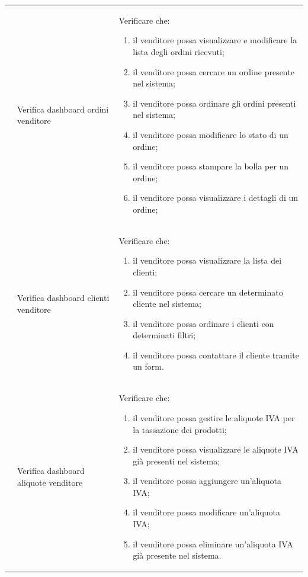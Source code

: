\begin{center}
\begin{longtable}{|p{1cm}|p{4.85cm}|p{9cm}|}
		 & Verifica dashboard ordini venditore & Verificare che:
		\begin{enumerate}
			\item il venditore possa visualizzare e modificare la lista degli ordini ricevuti;
			\item il venditore possa cercare un ordine presente nel sistema;
			\item il venditore possa ordinare gli ordini presenti nel sistema;
			\item il venditore possa modificare lo stato di un ordine;
			\item il venditore possa stampare la bolla per un ordine;
			\item il venditore possa visualizzare i dettagli di un ordine;
		\end{enumerate} \\

		 & Verifica dashboard clienti venditore & Verificare che:
		\begin{enumerate}
			\item il venditore possa visualizzare la lista dei clienti;
			\item il venditore possa cercare un determinato cliente nel sistema;
			\item il venditore possa ordinare i clienti con determinati filtri;
			\item il venditore possa contattare il cliente tramite un form.
		\end{enumerate} \\

		 & Verifica dashboard aliquote venditore & Verificare che:
		\begin{enumerate}
			\item il venditore possa gestire le aliquote IVA per la tassazione dei prodotti;
			\item il venditore possa visualizzare le aliquote IVA già presenti nel sistema;
			\item il venditore possa aggiungere un'aliquota IVA;
			\item il venditore possa modificare un'aliquota IVA;
			\item il venditore possa eliminare un'aliquota IVA già presente nel sistema.
		\end{enumerate} \\


\end{longtable}
\end{center}
